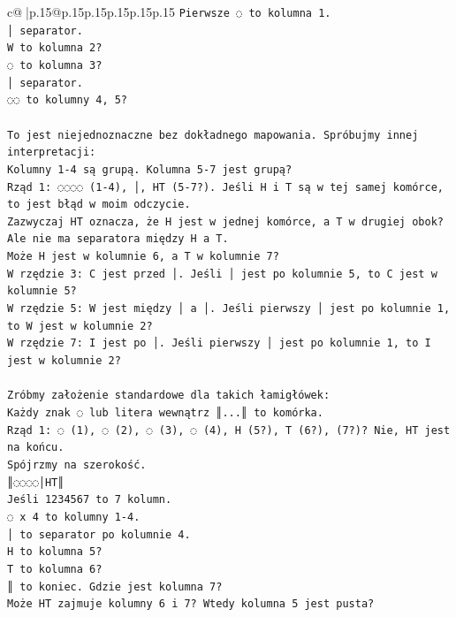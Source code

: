 \documentclass{article}
\begin{document}
{\begin{supertabular}{c@{$\;$}|p{.15\linewidth}@{}p{.15\linewidth}p{.15\linewidth}p{.15\linewidth}p{.15\linewidth}p{.15\linewidth}}
{{{\texttt{Pierwsze ◌ to kolumna 1.} \\
\texttt{│ separator.} \\
\texttt{W to kolumna 2?} \\
\texttt{◌ to kolumna 3?} \\
\texttt{│ separator.} \\
\texttt{◌◌ to kolumny 4, 5?} \\
\\ 
\texttt{To jest niejednoznaczne bez dokładnego mapowania. Spróbujmy innej interpretacji:} \\
\texttt{Kolumny 1{-}4 są grupą. Kolumna 5{-}7 jest grupą?} \\
\texttt{Rząd 1: ◌◌◌◌ (1{-}4), │, HT (5{-}7?). Jeśli H i T są w tej samej komórce, to jest błąd w moim odczycie.} \\
\texttt{Zazwyczaj HT oznacza, że H jest w jednej komórce, a T w drugiej obok? Ale nie ma separatora między H a T.} \\
\texttt{Może H jest w kolumnie 6, a T w kolumnie 7?} \\
\texttt{W rzędzie 3: C jest przed │. Jeśli │ jest po kolumnie 5, to C jest w kolumnie 5?} \\
\texttt{W rzędzie 5: W jest między │ a │. Jeśli pierwszy │ jest po kolumnie 1, to W jest w kolumnie 2?} \\
\texttt{W rzędzie 7: I jest po │. Jeśli pierwszy │ jest po kolumnie 1, to I jest w kolumnie 2?} \\
\\ 
\texttt{Zróbmy założenie standardowe dla takich łamigłówek:} \\
\texttt{Każdy znak ◌ lub litera wewnątrz ║...║ to komórka.} \\
\texttt{Rząd 1: ◌ (1), ◌ (2), ◌ (3), ◌ (4), H (5?), T (6?),   (7?)? Nie, HT jest na końcu.} \\
\texttt{Spójrzmy na szerokość.} \\
\texttt{║◌◌◌◌│HT║} \\
\texttt{Jeśli 1234567 to 7 kolumn.} \\
\texttt{◌ x 4 to kolumny 1{-}4.} \\
\texttt{│ to separator po kolumnie 4.} \\
\texttt{H to kolumna 5?} \\
\texttt{T to kolumna 6?} \\
\texttt{║ to koniec. Gdzie jest kolumna 7?} \\
\texttt{Może HT zajmuje kolumny 6 i 7? Wtedy kolumna 5 jest pusta?} \\
}}}
\end{supertabular}}
\end{document}
